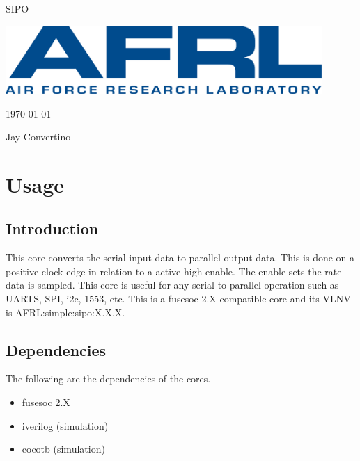 \begin{titlepage}
  \begin{center}

  {\Huge SIPO}

  \vspace{25mm}

  \includegraphics[width=0.90\textwidth,height=\textheight,keepaspectratio]{img/AFRL.png}

  \vspace{25mm}

  \today

  \vspace{15mm}

  {\Large Jay Convertino}

  \end{center}
\end{titlepage}

\tableofcontents

\newpage

\section{Usage}

\subsection{Introduction}

\par
This core converts the serial input data to parallel output data. This is done on a positive clock edge in relation to a active high enable.
The enable sets the rate data is sampled. This core is useful for
any serial to parallel operation such as UARTS, SPI, i2c, 1553, etc. This is a fusesoc 2.X compatible core and its VLNV is
AFRL:simple:sipo:X.X.X.

\subsection{Dependencies}

\par
The following are the dependencies of the cores.

\begin{itemize}
  \item fusesoc 2.X
  \item iverilog (simulation)
  \item cocotb (simulation)
\end{itemize}

